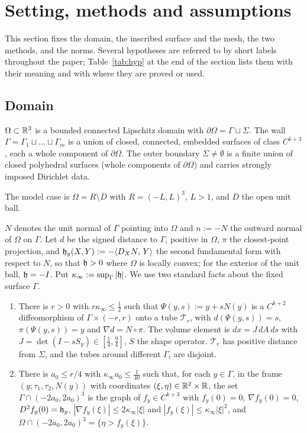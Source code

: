 \section{Setting, methods and assumptions}\label{sec:setting}

This section fixes the domain, the inscribed surface and the mesh, the two methods, and the norms. Several hypotheses are referred to by short labels throughout the paper; Table~\ref{tab:hyp} at the end of the section lists them with their meaning and with where they are proved or used.

\subsection{Domain}
\begin{assumption}[Domain]\label{set:dom}
$\Omega\subset\mathbb R^3$ is a bounded connected Lipschitz domain with $\partial\Omega=\Gamma\sqcup\Sigma$. The wall $\Gamma=\Gamma_1\sqcup\dots\sqcup\Gamma_m$ is a union of closed, connected, embedded surfaces of class $C^{k+3}$, each a whole component of $\partial\Omega$. The outer boundary $\Sigma\ne\emptyset$ is a finite union of closed polyhedral surfaces (whole components of $\partial\Omega$) and carries strongly imposed Dirichlet data.
\end{assumption}

The model case is $\Omega=R\setminus\overline D$ with $R=(-L,L)^3$, $L>1$, and $D$ the open unit ball.

$N$ denotes the unit normal of $\Gamma$ pointing into $\Omega$ and $n:=-N$ the outward normal of $\Omega$ on $\Gamma$. Let $d$ be the signed distance to $\Gamma$, positive in $\Omega$, $\pi$ the closest-point projection, and $\mathfrak h_y(X,Y):=-\langle D_XN,\, Y\rangle$ the second fundamental form with respect to $N$, so that $\mathfrak h>0$ where $\Omega$ is locally convex; for the exterior of the unit ball, $\mathfrak h=-I$. Put $\kappa_\infty:=\sup_\Gamma|\mathfrak h|$. We use two standard facts about the fixed surface $\Gamma$.
\begin{enumerate}
\item[(T)] There is $r>0$ with $r\kappa_\infty\le\frac12$ such that $\Psi(y,s):=y+sN(y)$ is a $C^{k+2}$ diffeomorphism of $\Gamma\times(-r,r)$ onto a tube $\mathcal T_r$, with $d(\Psi(y,s))=s$, $\pi(\Psi(y,s))=y$ and $\nabla d=N\circ\pi$. The volume element is $dx=J\,dA\,ds$ with $J=\det(I-sS_y)\in[\frac14,\frac94]$, $S$ the shape operator. $\mathcal T_r$ has positive distance from $\Sigma$, and the tubes around different $\Gamma_i$ are disjoint.
\item[(Gr)] There is $a_0\le r/4$ with $\kappa_\infty a_0\le\frac1{40}$ such that, for each $y\in\Gamma$, in the frame $(y;\tau_1,\tau_2,N(y))$ with coordinates $(\xi,\eta)\in\mathbb R^2\times\mathbb R$, the set $\Gamma\cap(-2a_0,2a_0)^3$ is the graph of $f_y\in C^{k+3}$ with $f_y(0)=0$, $\nabla f_y(0)=0$, $D^2f_y(0)=\mathfrak h_y$, $|\nabla f_y(\xi)|\le2\kappa_\infty|\xi|$ and $|f_y(\xi)|\le\kappa_\infty|\xi|^2$, and $\Omega\cap(-2a_0,2a_0)^3=\{\eta>f_y(\xi)\}$.
\end{enumerate}

